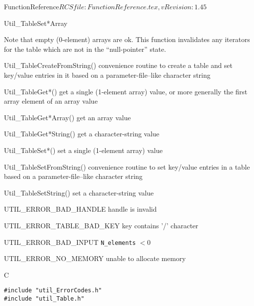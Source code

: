\begin{cactuspart}{5}{FunctionReference}{$RCSfile: FunctionReference.tex,v $}{$Revision: 1.45 $}
\begin{FunctionDescription}{Util\_TableSet*Array}
\begin{Discussion}
Note that empty (0-element) arrays are ok.
\NewPar
This function invalidates any iterators for the table which are
not in the ``null-pointer'' state.
\end{Discussion}

\begin{SeeAlso}{Util\_TableCreateFromString()}
convenience routine to create a table and set key/value entries
in it based on a parameter-file--like character string
\end{SeeAlso}
\begin{SeeAlso}{Util\_TableGet*()}
get a single (1-element array) value,
or more generally the first array element of an array value
\end{SeeAlso}
\begin{SeeAlso}{Util\_TableGet*Array()}
get an array value
\end{SeeAlso}
\begin{SeeAlso}{Util\_TableGet*String()}
get a character-string value
\end{SeeAlso}
\begin{SeeAlso}{Util\_TableSet*()}
set a single (1-element array) value
\end{SeeAlso}
\begin{SeeAlso}{Util\_TableSetFromString()}
convenience routine to set key/value entries in a table based on a
parameter-file--like character string
\end{SeeAlso}
\begin{SeeAlso}{Util\_TableSetString()}
set a character-string value
\end{SeeAlso}

\begin{Error}{UTIL\_ERROR\_BAD\_HANDLE}
handle is invalid
\end{Error}
\begin{Error}{UTIL\_ERROR\_TABLE\_BAD\_KEY}
key contains '/' character
\end{Error}
\begin{Error}{UTIL\_ERROR\_BAD\_INPUT}
\verb|N_elements| $< 0$
\end{Error}
\begin{Error}{UTIL\_ERROR\_NO\_MEMORY}
unable to allocate memory
\end{Error}

\begin{Example}{C}
\begin{verbatim}
#include "util_ErrorCodes.h"
#include "util_Table.h"


\end{verbatim}
\end{Example}
\end{FunctionDescription}
\end{cactuspart}

